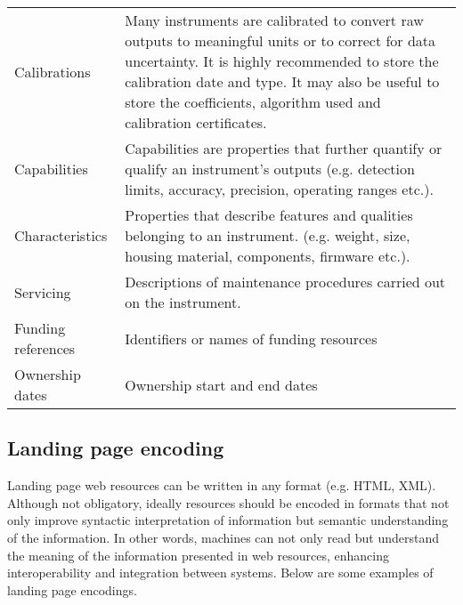 \documentclass[a4paper,10pt,english]{sphinxmanual}
\begin{document}
\begin{savenotes}\sphinxattablestart
\centering
{}
\sphinxthecaptionisattop
{}\label{\detokenize{white-paper/landing-page-content:id3}}\label{\detokenize{white-paper/landing-page-content:tab-landing-content-events}}
\sphinxaftertopcaption
\begin{tabulary}{\linewidth}[t]{|T|T|}
\hline
\sphinxstyletheadfamily 
{}
&\sphinxstyletheadfamily 
{}
\\
\hline
Calibrations
&
Many instruments are calibrated to convert raw
outputs to meaningful units or to correct for
data uncertainty. It is highly recommended to
store the calibration date and type. It may
also be useful to store the coefficients,
algorithm used and calibration certificates.
\\
\hline
Capabilities
&
Capabilities are properties that further
quantify or qualify an instrument’s outputs
(e.g. detection limits, accuracy, precision,
operating ranges etc.).
\\
\hline
Characteristics
&
Properties that describe features and
qualities belonging to an instrument. (e.g.
weight, size, housing material, components,
firmware etc.).
\\
\hline
Servicing
&
Descriptions of maintenance procedures carried
out on the instrument.
\\
\hline
Funding references
&
Identifiers or names of funding resources
\\
\hline
Ownership dates
&
Ownership start and end dates
\\
\hline
\end{tabulary}
\par
\sphinxattableend\end{savenotes}


\subsection{Landing page encoding}
\label{\detokenize{white-paper/landing-page-encoding:landing-page-encoding}}\label{\detokenize{white-paper/landing-page-encoding:id1}}\label{\detokenize{white-paper/landing-page-encoding::doc}}
Landing page web resources can be written in any format (e.g. HTML,
XML). Although not obligatory, ideally resources should be encoded in
formats that not only improve syntactic interpretation of information
but semantic understanding of the information. In other words, machines
can not only read but understand the meaning of the information
presented in web resources, enhancing interoperability and integration
between systems. Below are some examples of landing page encodings.
\end{document}
